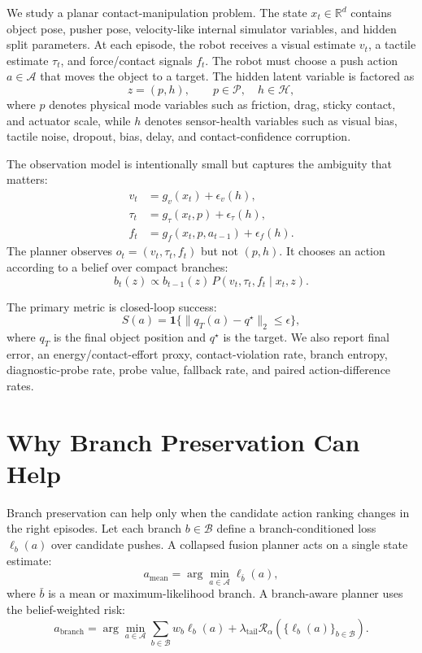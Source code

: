 \documentclass{article}
\newcommand{\belief}{b}
\newcommand{\latent}{z}
\newcommand{\state}{x}
\newcommand{\obs}{o}
\newcommand{\act}{a}
\newcommand{\branchset}{\mathcal{B}}
\newcommand{\phys}{\mathcal{P}}
\newcommand{\health}{\mathcal{H}}
\newcommand{\candidates}{\mathcal{A}}
\newcommand{\risk}{\mathcal{R}}
\newcommand{\Real}{\mathbb{R}}
\begin{document}
We study a planar contact-manipulation problem. The state $\state_t\in\Real^d$ contains object pose, pusher pose, velocity-like internal simulator variables, and hidden split parameters. At each episode, the robot receives a visual estimate $v_t$, a tactile estimate $\tau_t$, and force/contact signals $f_t$. The robot must choose a push action $\act\in\candidates$ that moves the object to a target. The hidden latent variable is factored as
\begin{equation}
  \latent = (p,h),\qquad p\in\phys,\quad h\in\health,
\end{equation}
where $p$ denotes physical mode variables such as friction, drag, sticky contact, and actuator scale, while $h$ denotes sensor-health variables such as visual bias, tactile noise, dropout, bias, delay, and contact-confidence corruption.

The observation model is intentionally small but captures the ambiguity that matters:
\begin{align}
  v_t &= g_v(\state_t) + \epsilon_v(h),\\
  \tau_t &= g_\tau(\state_t,p) + \epsilon_\tau(h),\\
  f_t &= g_f(\state_t,p,\act_{t-1}) + \epsilon_f(h).
\end{align}
The planner observes $\obs_t=(v_t,\tau_t,f_t)$ but not $(p,h)$. It chooses an action according to a belief over compact branches:
\begin{equation}
  \belief_t(\latent)\propto
  \belief_{t-1}(\latent)\,
  P(v_t,\tau_t,f_t\mid \state_t,\latent).
\end{equation}

The primary metric is closed-loop success:
\begin{equation}
  S(\act)=\mathbf{1}\{ \|q_T(\act)-q^\star\|_2\leq \epsilon\},
\end{equation}
where $q_T$ is the final object position and $q^\star$ is the target. We also report final error, an energy/contact-effort proxy, contact-violation rate, branch entropy, diagnostic-probe rate, probe value, fallback rate, and paired action-difference rates.

\section{Why Branch Preservation Can Help}

Branch preservation can help only when the candidate action ranking changes in the right episodes. Let each branch $b\in\branchset$ define a branch-conditioned loss $\ell_b(\act)$ over candidate pushes. A collapsed fusion planner acts on a single state estimate:
\begin{equation}
  \act_{\mathrm{mean}}=\arg\min_{\act\in\candidates}\ell_{\bar b}(\act),
\end{equation}
where $\bar b$ is a mean or maximum-likelihood branch. A branch-aware planner uses the belief-weighted risk:
\begin{equation}
  \act_{\mathrm{branch}}=\arg\min_{\act\in\candidates}
  \sum_{b\in\branchset} w_b \ell_b(\act) + \lambda_{\mathrm{tail}}\risk_\alpha(\{\ell_b(\act)\}_{b\in\branchset}).
\end{equation}
\end{document}
